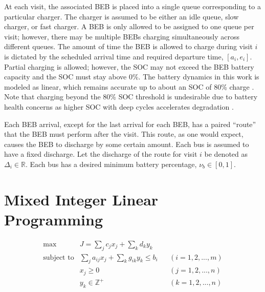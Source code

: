 \documentclass[ee,thesis]{usuthesis}
\begin{document}
At each visit, the associated BEB is placed into a single queue corresponding to a particular charger. The charger is
assumed to be either an idle queue, slow charger, or fast charger. A BEB is only allowed to be assigned to one queue per
visit; however, there may be multiple BEBs charging simultaneously across different queues. The amount of time the BEB
is allowed to charge during visit \(i\) is dictated by the scheduled arrival time and required departure time, \([a_i,
e_i]\). Partial charging is allowed; however, the SOC may not exceed the BEB battery capacity and the SOC must stay above
0\%. The battery dynamics in this work is modeled as linear, which remains accurate up to about an SOC of 80\% charge
\cite{liu-2020-batter-elect}. Note that charging beyond the 80\% SOC threshold is undesirable due to battery health
concerns as higher SOC with deep cycles accelerates degradation \cite{edge-2021-lithium,millner-2010-model-lithium}.

Each BEB arrival, except for the last arrival for each BEB, has a paired ``route'' that the BEB must perform after the
visit. This route, as one would expect, causes the BEB to discharge by some certain amount. Each bus is assumed to have
a fixed discharge. Let the discharge of the route for visit \(i\) be denoted as \(\Delta_i \in \mathbb{R}\). Each bus has a desired minimum
battery percentage, \(\nu_b \in [0, 1]\).

\section{Mixed Integer Linear Programming}
\label{sec:orgea1d8ee}

\begin{subequations}
\label{eq:milp-structure}
\begin{align}
&\text{max}        &J = \sum_j c_j x_j + \sum_k d_k y_k&         &               &\label{eq:fuzzy-milp-objective}\\
&\text{subject to} &\sum_j a_{ij} x_j + \sum_k g_{ik} y_k \le b_i&  &(i = 1,2,...,m)& \label{eq:fuzzy-milp-constraint}\\
&                  &x_j \ge 0&                              &(j = 1,2,...,n)& \label{eq:fuzzy-milp-continuous}\\
&                  &y_k \in \mathbb{Z^+}&                   &(k = 1,2,...,n)& \label{eq:fuzzy-milp-integer}\\
&\end{align}
\end{subequations}
\end{document}
